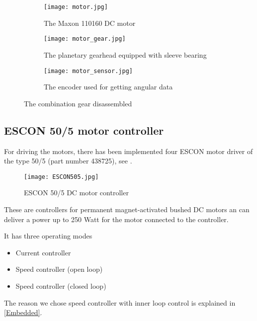 \begin{figure}[H]
	\centering
	\begin{subfigure}{.32\textwidth}
		\vspace{0pt}
		\centering
		\texttt{[image: motor.jpg]}
		\caption{The Maxon 110160 \newline DC motor\cite{motor_motor}}
		\label{fig:motor}
	\end{subfigure}
	\begin{subfigure}{.32\textwidth}
		\centering
		\texttt{[image: motor\_gear.jpg]}
		\caption{The planetary gearhead equipped with sleeve bearing\cite{motor_gear}}
		\label{fig:motor_gear}
	\end{subfigure}
	\begin{subfigure}{.32\textwidth}
	\hspace{5pt}
		\centering
		\texttt{[image: motor\_sensor.jpg]}
		\caption{The encoder used for getting angular data\cite{motor_encoder}}
		\label{fig:motor_sensor}
	\end{subfigure}
	\caption{The combination gear disassembled}
	\label{fig:Full_motor _dis}
\end{figure}





\subsection{ESCON 50/5 motor controller}
For driving the motors, there has been implemented four ESCON motor driver of the type 50/5 (part number 438725), see . 

\begin{figure}[H]
	\centering
		\centering
		\texttt{[image: ESCON505.jpg]}
		\caption{ESCON 50/5 DC motor controller\cite{ESCON_motor_controller}}
		\label{fig:ESCON505}
\end{figure}

These are controllers for permanent magnet-activated bushed DC motors an can deliver a power up to 250 Watt for the motor connected to the controller. 

It has three operating modes

\begin{itemize}
\item Current controller
\item Speed controller (open loop)
\item Speed controller (closed loop)
\end{itemize}

The reason we chose speed controller with inner loop control is explained in \ref{Embedded}.





